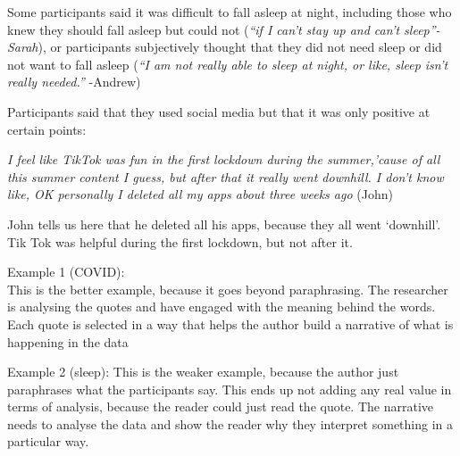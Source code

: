 \documentclass[
  english,
  letterpaper,
  DIV=11,
  numbers=noendperiod]{scrreprt}
\begin{document}
\begin{tcolorbox}[enhanced jigsaw, breakable, bottomtitle=1mm, leftrule=.75mm, opacityback=0, colbacktitle=quarto-callout-note-color!10!white, opacitybacktitle=0.6, toprule=.15mm, colback=white, left=2mm, coltitle=black, bottomrule=.15mm, titlerule=0mm, title={Extract 2 - from a study about social media use during the pandemic}, toptitle=1mm, colframe=quarto-callout-note-color-frame, arc=.35mm, rightrule=.15mm]

Some participants said it was difficult to fall asleep at night,
including those who knew they should fall asleep but could not
(\emph{``if I can't stay up and can't sleep''- Sarah}), or participants
subjectively thought that they did not need sleep or did not want to
fall asleep (\emph{``I am not really able to sleep at night, or like,
sleep isn't really needed.''} -Andrew)

Participants said that they used social media but that it was only
positive at certain points:

\emph{I feel like TikTok was fun in the first lockdown during the
summer,'cause of all this summer content I guess, but after that it
really went downhill. I don't know like, OK personally I deleted all my
apps about three weeks ago} (John)

John tells us here that he deleted all his apps, because they all went
`downhill'. Tik Tok was helpful during the first lockdown, but not after
it.

\end{tcolorbox}

\begin{tcolorbox}[enhanced jigsaw, breakable, bottomtitle=1mm, leftrule=.75mm, opacityback=0, colbacktitle=quarto-callout-caution-color!10!white, opacitybacktitle=0.6, toprule=.15mm, colback=white, left=2mm, coltitle=black, bottomrule=.15mm, titlerule=0mm, title={Show me the answer}, toptitle=1mm, colframe=quarto-callout-caution-color-frame, arc=.35mm, rightrule=.15mm]

Example 1 (COVID):\\
This is the better example, because it goes beyond paraphrasing. The
researcher is analysing the quotes and have engaged with the meaning
behind the words. Each quote is selected in a way that helps the author
build a narrative of what is happening in the data

Example 2 (sleep): This is the weaker example, because the author just
paraphrases what the participants say. This ends up not adding any real
value in terms of analysis, because the reader could just read the
quote. The narrative needs to analyse the data and show the reader why
they interpret something in a particular way.

\end{tcolorbox}
\end{document}
